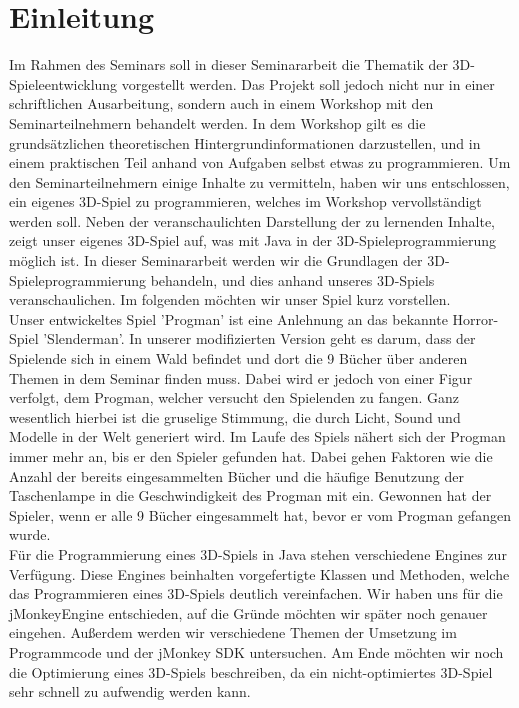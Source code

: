 \chapter{Einleitung}\label{ch:einleitung}
Im Rahmen des Seminars  soll in dieser Seminararbeit die Thematik der 3D-Spieleentwicklung vorgestellt werden. Das Projekt soll jedoch nicht nur in einer schriftlichen Ausarbeitung, sondern auch in einem Workshop mit den Seminarteilnehmern behandelt werden. In dem Workshop gilt es die grundsätzlichen theoretischen Hintergrundinformationen darzustellen, und in einem praktischen Teil anhand von Aufgaben selbst etwas zu programmieren. Um den Seminarteilnehmern einige Inhalte zu vermitteln, haben wir uns entschlossen, ein eigenes 3D-Spiel zu programmieren, welches im Workshop vervollständigt werden soll. Neben der veranschaulichten Darstellung der zu lernenden Inhalte, zeigt unser eigenes 3D-Spiel auf, was mit Java in der 3D-Spieleprogrammierung möglich ist. In dieser Seminararbeit werden wir die Grundlagen der 3D-Spieleprogrammierung behandeln, und dies anhand unseres 3D-Spiels veranschaulichen. Im folgenden möchten wir unser Spiel kurz vorstellen.\\

Unser entwickeltes Spiel 'Progman' ist eine Anlehnung an das bekannte Horror-Spiel 'Slenderman'. In unserer modifizierten Version geht es darum, dass der Spielende sich in einem Wald befindet und dort die 9 Bücher über anderen Themen in dem Seminar finden muss. Dabei wird er jedoch von einer Figur verfolgt, dem Progman, welcher versucht den Spielenden zu fangen. Ganz wesentlich hierbei ist die gruselige Stimmung, die durch Licht, Sound und Modelle in der Welt generiert wird. Im Laufe des Spiels nähert sich der Progman immer mehr an, bis er den Spieler gefunden hat. Dabei gehen Faktoren wie die Anzahl der bereits eingesammelten Bücher und die häufige Benutzung der Taschenlampe in die Geschwindigkeit des Progman mit ein. Gewonnen hat der Spieler, wenn er alle 9 Bücher eingesammelt hat, bevor er vom Progman gefangen wurde. \\

Für die Programmierung eines 3D-Spiels in Java stehen verschiedene Engines zur Verfügung. Diese Engines beinhalten vorgefertigte Klassen und Methoden, welche das Programmieren eines 3D-Spiels deutlich vereinfachen. Wir haben uns für die jMonkeyEngine entschieden, auf die Gründe möchten wir später noch genauer eingehen. Außerdem werden wir verschiedene Themen der Umsetzung im Programmcode und der jMonkey SDK untersuchen. Am Ende möchten wir noch die Optimierung eines 3D-Spiels beschreiben, da ein nicht-optimiertes 3D-Spiel sehr schnell zu aufwendig werden kann.



